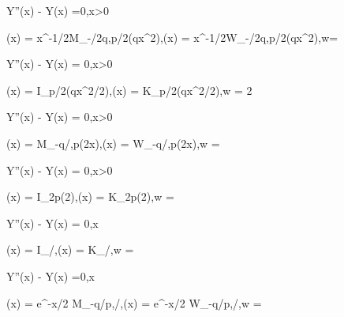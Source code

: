 \be
{} Y''(x) - Y(x) =0,\quad x>0
\ee

\be
\psi(x) = x^{-1/2}M_{-\lm/2q,p/2}(qx^2),\quad\quad \varphi(x) = x^{-1/2}W_{-\lm/2q,p/2}(qx^2),\quad\quad w=
\ee

\item 

\be
{} Y''(x) - Y(x) = 0,\quad x>0
\ee

\be
\psi(x) = I_{p/2}(qx^2/2),\quad\quad \varphi(x) = K_{p/2}(qx^2/2),\quad\quad w = 2
\ee

\item 

\be
{} Y''(x) - Y(x) = 0,\quad x>0
\ee

\be
\psi(x) = M_{-q/\sqrt{2\lm},p}(2x\sqrt{2\lm}),\quad\quad \varphi(x) = W_{-q/\sqrt{2\lm},p}(2x\sqrt{2\lm}),\quad\quad w = 
\ee

\item 

\be
{} Y''(x) - Y(x) = 0,\quad x>0
\ee

\be
\psi(x) = I_{2p}(2),\quad\quad \varphi(x) = K_{2p}(2),\quad\quad w = 
\ee

\item 

\be
{} Y''(x) - Y(x) = 0,\quad x\in \R
\ee

\be
\psi(x) = I_{\sqrt{2\lm}/\abs{\beta}},\quad\quad \varphi(x) = K_{\sqrt{2\lm}/\abs{\beta}},\quad\quad w = \beta
\ee

\item

\be
{} Y''(x) - Y(x) =0,\quad x\in \R
\ee

\be
\psi(x) = e^{-\beta x/2} M_{-q/p\abs{\beta},\sqrt{2\lm}/\beta{\beta}},\quad\quad \varphi(x) = e^{-\beta x/2} W_{-q/p\abs{\beta},\sqrt{2\lm}/\beta{\beta}},\quad\quad w = 
\ee

